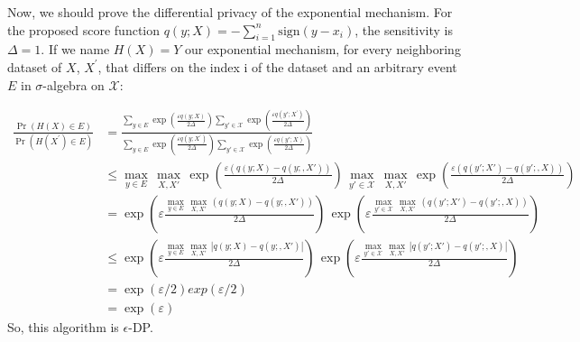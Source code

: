 \documentclass[12pt]{extarticle}
\begin{document}
Now, we should prove the differential privacy of the exponential mechanism. For the proposed score function \(q(y; X) = -\sum_{i=1}^{n} \text{sign}(y - x_i)\), the sensitivity is \(\Delta = 1\). If we name \(H(X) = Y\) our exponential mechanism, for every neighboring dataset of $X$, $X^{'}$, that differs on the index i of the dataset  and an arbitrary event \(E\) in \(\sigma\)-algebra on \(\mathcal{X}\):

\begin{align*}
	\frac{\Pr(H(X) \in E)}{\Pr(H(X^{'}) \in E)} &= \frac{\sum_{y\in E}\exp\left(\frac{\varepsilon q(y;X)}{2\Delta}\right)\sum_{y'\in \mathcal{X}}\exp\left(\frac{\varepsilon q(y';X^{'})}{2\Delta}\right)}{\sum_{y\in E}\exp\left(\frac{\varepsilon q(y;X^{'})}{2\Delta}\right)\sum_{y'\in \mathcal{X}}\exp\left(\frac{\varepsilon q(y';X)}{2\Delta}\right)}\\
	&\le \underset{y\in E}{\max} \, \underset{X,X'}{\max}\,\exp\left(\frac{\varepsilon (q(y;X)-q(y;,X'))}{2\Delta}\right)\,\underset{y'\in \mathcal{X}}{\max} \, \underset{X,X'}{\max}\,\exp\left(\frac{\varepsilon (q(y';X')-q(y';,X))}{2\Delta}\right)\\
	&=\exp\left(\varepsilon\frac{ \underset{y\in E}{\max} \, \underset{X,X'}{\max}\,(q(y;X)-q(y;,X'))}{2\Delta}\right)\,\exp\left(\varepsilon\frac{ \underset{y'\in \mathcal{X}}{\max} \, \underset{X,X'}{\max}\,(q(y';X')-q(y';,X))}{2\Delta}\right)\\
	&\le \exp\left(\varepsilon\frac{ \underset{y\in E}{\max} \, \underset{X,X'}{\max}\,|q(y;X)-q(y;,X')|}{2\Delta}\right)\,\exp\left(\varepsilon\frac{ \underset{y'\in \mathcal{X}}{\max} \, \underset{X,X'}{\max}\,|q(y';X')-q(y';,X)|}{2\Delta}\right)\\
	&= \exp(\varepsilon/2)exp(\varepsilon/2)\\
	&= \exp(\varepsilon)
\end{align*}
So, this algorithm is $\epsilon$-DP.



	
\end{document}
